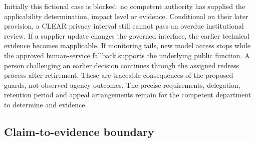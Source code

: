 Initially this fictional case is blocked: no competent authority has supplied
the applicability determination, impact level or evidence. Conditional on
their later provision, a CLEAR privacy interval still cannot pass an overdue
institutional review. If a supplier update changes the governed interface,
the earlier technical evidence becomes inapplicable. If monitoring fails,
new model access stops while the approved human-service fallback supports
the underlying public function. A person challenging an earlier decision
continues through the assigned redress process after retirement. These are
traceable consequences of the proposed guards, not observed agency outcomes.
The precise requirements, delegation, retention period and appeal arrangements
remain for the competent department to determine and evidence.

\subsection{Claim-to-evidence boundary}
